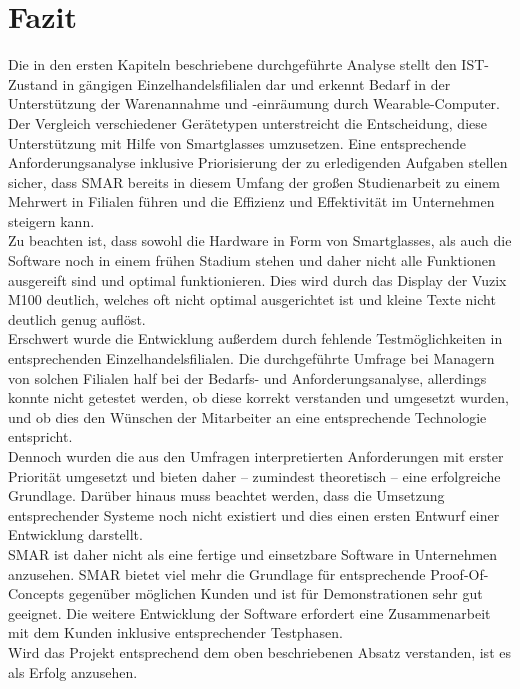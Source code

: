 \chapter{Fazit}
Die in den ersten Kapiteln beschriebene durchgeführte Analyse stellt den IST-Zustand in gängigen Einzelhandelsfilialen dar und erkennt Bedarf in der Unterstützung der Warenannahme und -einräumung durch Wearable-Computer. Der Vergleich verschiedener Gerätetypen unterstreicht die Entscheidung, diese Unterstützung mit Hilfe von Smartglasses umzusetzen. Eine entsprechende Anforderungsanalyse inklusive Priorisierung der zu erledigenden Aufgaben stellen sicher, dass \ac{SMAR} bereits in diesem Umfang der großen Studienarbeit zu einem Mehrwert in Filialen führen und die Effizienz und Effektivität im Unternehmen steigern kann.\\

Zu beachten ist, dass sowohl die Hardware in Form von Smartglasses, als auch die Software noch in einem frühen Stadium stehen und daher nicht alle Funktionen ausgereift sind und optimal funktionieren. Dies wird \zB durch das Display der Vuzix M100 deutlich, welches oft nicht optimal ausgerichtet ist und kleine Texte nicht deutlich genug auflöst.\\

Erschwert wurde die Entwicklung außerdem durch fehlende Testmöglichkeiten in entsprechenden Einzelhandelsfilialen. Die durchgeführte Umfrage bei Managern von solchen Filialen half bei der Bedarfs- und Anforderungsanalyse, allerdings konnte nicht getestet werden, ob diese korrekt verstanden und umgesetzt wurden, und ob dies den Wünschen der Mitarbeiter an eine entsprechende Technologie entspricht.\\

Dennoch wurden die aus den Umfragen interpretierten Anforderungen mit erster Priorität umgesetzt und bieten daher -- zumindest theoretisch -- eine erfolgreiche Grundlage. Darüber hinaus muss beachtet werden, dass die Umsetzung entsprechender Systeme noch nicht existiert und dies einen ersten Entwurf einer Entwicklung darstellt.\\

\ac{SMAR} ist daher nicht als eine fertige und einsetzbare Software in Unternehmen anzusehen. \ac{SMAR} bietet viel mehr die Grundlage für entsprechende Proof-Of-Concepts gegenüber möglichen Kunden und ist für Demonstrationen sehr gut geeignet. Die weitere Entwicklung der Software erfordert eine Zusammenarbeit mit dem Kunden inklusive entsprechender Testphasen.\\

Wird das Projekt entsprechend dem oben beschriebenen Absatz verstanden, ist es als Erfolg anzusehen.
